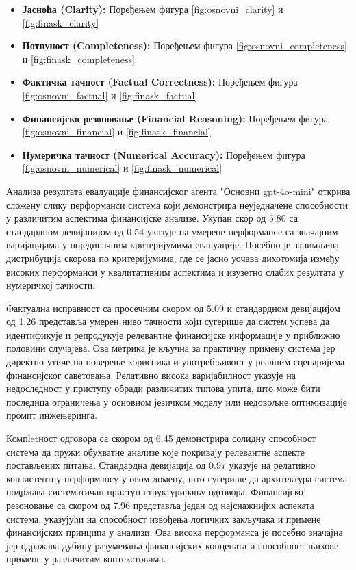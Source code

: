\begin{itemize}
    \item \textbf{Јасноћа (Clarity):} Поређењем фигура \ref{fig:osnovni_clarity} и \ref{fig:finask_clarity}
    \item \textbf{Потпуност (Completeness):} Поређењем фигура \ref{fig:osnovni_completeness} и \ref{fig:finask_completeness}
    \item \textbf{Фактичка тачност (Factual Correctness):} Поређењем фигура \ref{fig:osnovni_factual} и \ref{fig:finask_factual}
    \item \textbf{Финансијско резоновање (Financial Reasoning):} Поређењем фигура \ref{fig:osnovni_financial} и \ref{fig:finask_financial}
    \item \textbf{Нумеричка тачност (Numerical Accuracy):} Поређењем фигура \ref{fig:osnovni_numerical} и \ref{fig:finask_numerical}
\end{itemize}


Анализа резултата евалуације финансијског агента "Основни gpt-4o-mini" открива сложену слику перформанси система који демонстрира неуједначене способности у различитим аспектима финансијске анализе. Укупан скор од 5.80 са стандардном девијацијом од 0.54 указује на умерене перформансе са значајним варијацијама у појединачним критеријумима евалуације. Посебно је занимљива дистрибуција скорова по критеријумима, где се јасно уочава дихотомија између високих перформанси у квалитативним аспектима и изузетно слабих резултата у нумеричкој тачности.

Фактуална исправност са просечним скором од 5.09 и стандардном девијацијом од 1.26 представља умерен ниво тачности који сугерише да систем успева да идентификује и репродукује релевантне финансијске информације у приближно половини случајева. Ова метрика је кључна за практичну примену система јер директно утиче на поверење корисника и употребљивост у реалним сценаријима финансијског саветовања. Релативно висока варијабилност указује на недоследност у приступу обради различитих типова упита, што може бити последица ограничења у основном језичком моделу или недовољне оптимизације промпт инжењеринга.

Компletност одговора са скором од 6.45 демонстрира солидну способност система да пружи обухватне анализе које покривају релевантне аспекте постављених питања. Стандардна девијација од 0.97 указује на релативно конзистентну перформансу у овом домену, што сугерише да архитектура система подржава систематичан приступ структурирању одговора. Финансијско резоновање са скором од 7.96 представља један од најснажнијих аспеката система, указујући на способност извођења логичких закључака и примене финансијских принципа у анализи. Ова висока перформанса је посебно значајна јер одражава дубину разумевања финансијских концепата и способност њихове примене у различитим контекстовима.

